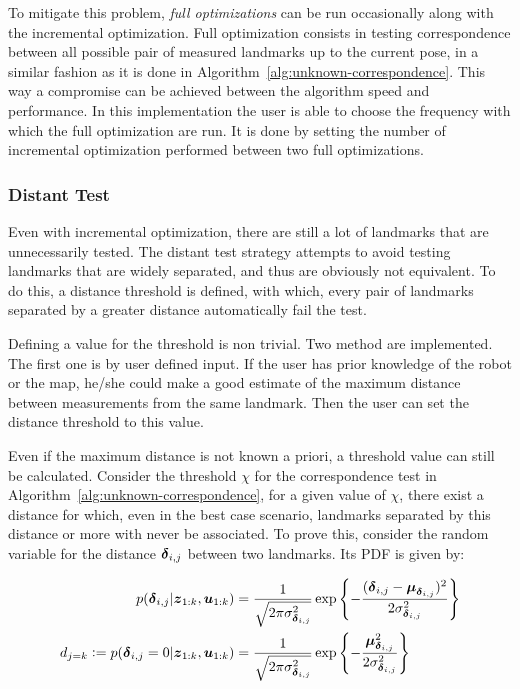 To mitigate this problem, \emph{full optimizations} can be run occasionally along with the incremental optimization. Full optimization consists in testing correspondence between all possible pair of measured landmarks up to the current pose, in a similar fashion as it is done in Algorithm~\ref{alg:unknown-correspondence}. This way a compromise can be achieved between the algorithm speed and performance. In this implementation the user is able to choose the frequency with which the full optimization are run. It is done by setting the number of incremental optimization performed between two full optimizations.  

\subsubsection{Distant Test}

Even with incremental optimization, there are still a lot of landmarks that are unnecessarily tested. The distant test strategy attempts to avoid testing landmarks that are widely separated, and thus are obviously not equivalent. To do this, a distance threshold is defined, with which, every pair of landmarks separated by a greater distance automatically fail the test. 

Defining a value for the threshold is non trivial. Two method are implemented. The first one is by user defined input. If the user has prior knowledge of the robot or the map, he/she could make a good estimate of the maximum distance between measurements from the same landmark. Then the user can set the distance threshold to this value.

Even if the maximum distance is not known a priori, a threshold value can still be calculated. Consider the threshold $\chi$ for the correspondence test in Algorithm~\ref{alg:unknown-correspondence}, for a given value of $\chi$, there exist a distance for which, even in the best case scenario, landmarks separated by this distance or more with never be associated. To prove this, consider the random variable for the distance  $\boldsymbol{\delta}_{i,j}$ between two landmarks. Its PDF is given by:

\begin{align}
p(\boldsymbol{\delta}_{i,j}|\boldsymbol{z}_{1:k},\boldsymbol{u}_{1:k})&=
\frac{1}{\sqrt{2\pi\sigma_{\boldsymbol{\delta}_{i,j}}^2}}
\exp\left\lbrace -\frac{(\boldsymbol{\delta}_{i,j}-\boldsymbol{\mu}_{\boldsymbol{\delta}_{i,j}})^2}{2\sigma_{\boldsymbol{\delta}_{i,j}}^2}\right\rbrace\\
d_{j=k} \vcentcolon= p(\boldsymbol{\delta}_{i,j}=0|\boldsymbol{z}_{1:k},\boldsymbol{u}_{1:k})&=
\frac{1}{\sqrt{2\pi\sigma_{\boldsymbol{\delta}_{i,j}}^2}}
\exp\left\lbrace -\frac{\boldsymbol{\mu}_{\boldsymbol{\delta}_{i,j}}^2}{2\sigma_{\boldsymbol{\delta}_{i,j}}^2}\right\rbrace 
\end{align}


